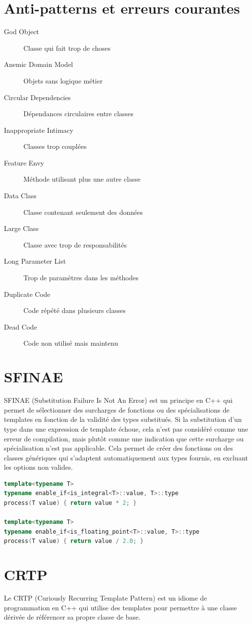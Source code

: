 \documentclass{article}
\begin{document}
\begin{multicols*}{3}
\section*{Anti-patterns et erreurs courantes}
\begin{description}
\item[God Object] Classe qui fait trop de choses
\item[Anemic Domain Model] Objets sans logique métier
\item[Circular Dependencies] Dépendances circulaires entre classes
\item[Inappropriate Intimacy] Classes trop couplées
\item[Feature Envy] Méthode utilisant plus une autre classe
\item[Data Class] Classe contenant seulement des données
\item[Large Class] Classe avec trop de responsabilités
\item[Long Parameter List] Trop de paramètres dans les méthodes
\item[Duplicate Code] Code répété dans plusieurs classes
\item[Dead Code] Code non utilisé mais maintenu
\end{description}

\section*{SFINAE}
SFINAE (Substitution Failure Is Not An Error) est un principe en C++ qui permet de sélectionner des surcharges de fonctions ou des spécialisations de templates en fonction de la validité des types substitués. Si la substitution d'un type dans une expression de template échoue, cela n'est pas considéré comme une erreur de compilation, mais plutôt comme une indication que cette surcharge ou spécialisation n'est pas applicable. Cela permet de créer des fonctions ou des classes génériques qui s'adaptent automatiquement aux types fournis, en excluant les options non valides.

\begin{lstlisting}[language=C++]
template<typename T>
typename enable_if<is_integral<T>::value, T>::type
process(T value) { return value * 2; }

template<typename T>
typename enable_if<is_floating_point<T>::value, T>::type
process(T value) { return value / 2.0; }
\end{lstlisting}

\section*{CRTP}
Le CRTP (Curiously Recurring Template Pattern) est un idiome de programmation en C++ qui utilise des templates pour permettre à une classe dérivée de référencer sa propre classe de base.


\end{multicols*}
\end{document}
